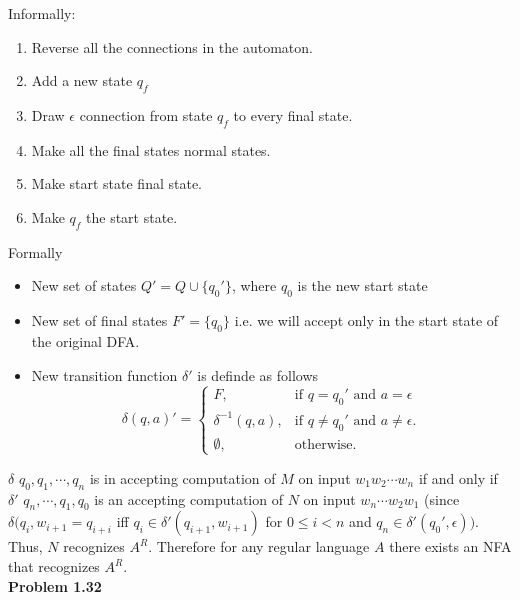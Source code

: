 \documentclass{article}
\newcommand{\problem}[1]{\large{\textbf{Problem #1} \\}}
\begin{document}
{{{Informally:
\begin{enumerate}[1., leftmargin = 0.5cm, nosep]
\item Reverse all the connections in the automaton.
\item Add a new state $q_f$
\item Draw $\epsilon$ connection from state $q_f$ to every final state.
\item Make all the final states normal states.
\item Make start state final state.
\item Make $q_f$ the start state. \\
\end{enumerate}
Formally
\begin{itemize}
\item New set of states $Q' = Q \cup \{q_0'\}$, where $q_0$ is the new start state
\item New set of final states $F' = \{q_0\}$ 
i.e. we will accept only in the start state of the original DFA.
\item New transition function $\delta'$ is definde as follows
\begin{equation}
  \delta(q,a) '=\begin{cases}
    F, & \text{if } q = q_0' \text{ and } a = \epsilon \\
    \delta^{-1}(q,a), & \text{if } q \neq q_0' \text{ and } a \neq \epsilon . \\
    \emptyset, & \text{otherwise}.
  \end{cases}
\end{equation}

\end{itemize}
$\delta$ $q_0, q_1, \cdots, q_n$ is in accepting computation of $M$ on input $w_1w_2\cdots w_n$ if
and only if $\delta'$ $q_n,\cdots ,q_1, q_0 $ is an accepting computation of $N$ on input $w_n \cdots w_2 w_1$ (since
$\delta(q_i,w_{i+1} = q_{i+i}$ iff $q_i \in \delta' (q_{i+1},w_{i+1})$ for $0 \leq i < n$ and 
$q_n \in \delta'(q_0', \epsilon))$. Thus, $N$ recognizes $A^R$. Therefore for any regular language $A$ there exists an NFA that recognizes
$A^R$.\\

\vspace{1cm}
\problem{1.32}

}}}
\end{document}
